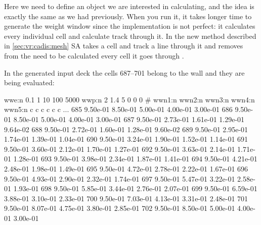 \begin{description}
\begin{description}

\end{description}

Here we need to define an object we are interested in calculating, and the idea is exactly the same as we had previously.
When you run it, it takes longer time to generate the weight window since the implementation is not perfect: it calculates every individual cell and calculate track through it.
In the new method described in \ref{sec:vr:cadis:mesh} SA takes a cell and track a line through it and removes from the need to be calculated every cell it goes through .

In the generated input deck the cells 687--701 belong to the wall and they are being evaluated:
\begin{deck}
wwe:n 0.1 1 10 100 5000
wwp:n 2 1.4 5 0 0 0
#   wwn1:n  wwn2:n  wwn3:n  wwn4:n  wwn5:n
c   c        c        c        c        c
...
685   9.50e-01 8.50e-01 5.00e-01 4.00e-01 3.00e-01
686   9.50e-01 8.50e-01 5.00e-01 4.00e-01 3.00e-01
687   9.50e-01 2.73e-01 1.61e-01 1.29e-01 9.64e-02
688   9.50e-01 2.72e-01 1.60e-01 1.28e-01 9.60e-02
689   9.50e-01 2.95e-01 1.74e-01 1.39e-01 1.04e-01
690   9.50e-01 3.24e-01 1.90e-01 1.52e-01 1.14e-01
691   9.50e-01 3.60e-01 2.12e-01 1.70e-01 1.27e-01
692   9.50e-01 3.63e-01 2.14e-01 1.71e-01 1.28e-01
693   9.50e-01 3.98e-01 2.34e-01 1.87e-01 1.41e-01
694   9.50e-01 4.21e-01 2.48e-01 1.98e-01 1.49e-01
695   9.50e-01 4.72e-01 2.78e-01 2.22e-01 1.67e-01
696   9.50e-01 4.93e-01 2.90e-01 2.32e-01 1.74e-01
697   9.50e-01 5.47e-01 3.22e-01 2.58e-01 1.93e-01
698   9.50e-01 5.85e-01 3.44e-01 2.76e-01 2.07e-01
699   9.50e-01 6.59e-01 3.88e-01 3.10e-01 2.33e-01
700   9.50e-01 7.03e-01 4.13e-01 3.31e-01 2.48e-01
701   9.50e-01 8.07e-01 4.75e-01 3.80e-01 2.85e-01
702   9.50e-01 8.50e-01 5.00e-01 4.00e-01 3.00e-01
\end{deck}


\end{description}
